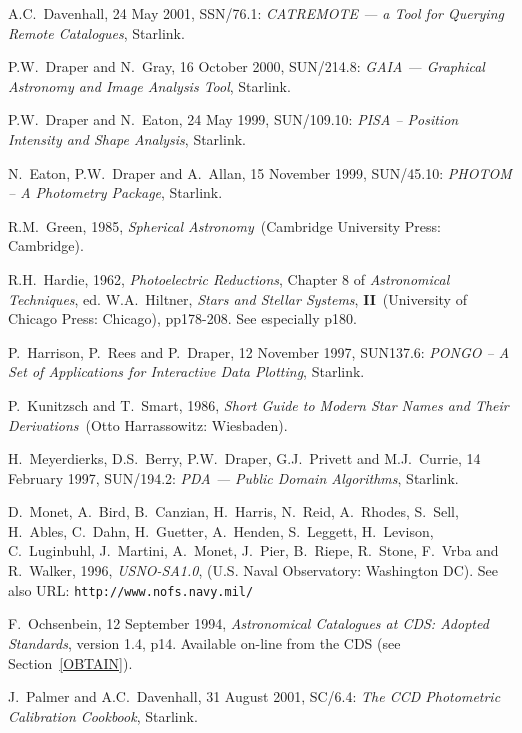 \documentclass[twoside,11pt]{article}
\newcommand{\htmladdnormallink}[2]{#1}
\newcommand{\xref}[3]{#1}
\renewcommand{\_}{\texttt{\symbol{95}}}
\begin{document}
\begin{thebibliography}{99}
   A.C.~Davenhall, 24 May 2001,
   \xref{SSN/76.1}{ssn76}{}: {\it CATREMOTE --- a Tool for Querying Remote
   Catalogues}, Starlink.

   P.W.~Draper and N.~Gray, 16 October 2000,
   \xref{SUN/214.8}{sun214}{}: {\it GAIA --- Graphical Astronomy and
   Image Analysis Tool}, Starlink.

   P.W.~Draper and N.~Eaton, 24 May 1999,
   \xref{SUN/109.10}{sun109}{}: {\it PISA -- Position Intensity and Shape
   Analysis}, Starlink.

   N.~Eaton, P.W.~Draper and A.~Allan, 15 November 1999,
   \xref{SUN/45.10}{sun45}{}: {\it PHOTOM -- A Photometry Package},
   Starlink.

   R.M.~Green, 1985, {\it Spherical Astronomy}\,
   (Cambridge University Press: Cambridge).

   R.H.~Hardie, 1962, {\it Photoelectric Reductions},
   Chapter 8 of {\it Astronomical Techniques}, ed. W.A.~Hiltner, {\it
   Stars and Stellar Systems}, {\bf II}\, (University of Chicago Press:
   Chicago), pp178-208.  See especially p180.

   P.~Harrison, P.~Rees and P.~Draper, 12 November 1997,
   \xref{SUN137.6}{sun137}{}: {\it PONGO -- A Set of Applications for
   Interactive Data Plotting}, Starlink.

   P.~Kunitzsch and T.~Smart, 1986, {\it Short Guide to
   Modern Star Names and Their Derivations}\, (Otto Harrassowitz:
   Wiesbaden).

   H.~Meyerdierks, D.S.~Berry, P.W.~Draper, G.J.~Privett
   and M.J.~Currie, 14 February 1997, \xref{SUN/194.2}{sun194}{}: {\it PDA
   --- Public Domain Algorithms}, Starlink.

   D.~Monet, A.~Bird, B.~Canzian, H.~Harris, N.~Reid,
   A.~Rhodes, S.~Sell, H.~Ables, C.~Dahn, H.~Guetter, A.~Henden,
   S.~Leggett, H.~Levison, C.~Luginbuhl, J.~Martini, A.~Monet, J.~Pier,
   B.~Riepe, R.~Stone, F.~Vrba and R.~Walker,
   1996, {\it USNO-SA1.0}, (U.S. Naval Observatory: Washington DC).
   See also URL: \htmladdnormallink{
   {\tt http://www.nofs.navy.mil/}}{http://www.nofs.navy.mil/}

   F.~Ochsenbein, 12 September 1994, {\it
   Astronomical Catalogues at CDS: Adopted Standards}, version 1.4, p14.
   Available on-line from the CDS (see Section~\ref{OBTAIN}).

   J.~Palmer and A.C.~Davenhall, 31 August 2001,
   \xref{SC/6.4}{sc6}{}: {\it The CCD Photometric Calibration Cookbook},
   Starlink.


\end{thebibliography}
\end{document}
